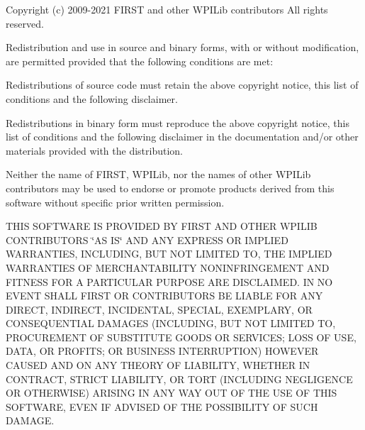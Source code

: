 Copyright (c) 2009-\/2021 FIRST and other WPILib contributors All rights reserved.

Redistribution and use in source and binary forms, with or without modification, are permitted provided that the following conditions are met\+:
\begin{DoxyItemize}
\item Redistributions of source code must retain the above copyright notice, this list of conditions and the following disclaimer.
\item Redistributions in binary form must reproduce the above copyright notice, this list of conditions and the following disclaimer in the documentation and/or other materials provided with the distribution.
\item Neither the name of FIRST, WPILib, nor the names of other WPILib contributors may be used to endorse or promote products derived from this software without specific prior written permission.
\end{DoxyItemize}

THIS SOFTWARE IS PROVIDED BY FIRST AND OTHER WPILIB CONTRIBUTORS \char`\"{}\+AS IS\char`\"{} AND ANY EXPRESS OR IMPLIED WARRANTIES, INCLUDING, BUT NOT LIMITED TO, THE IMPLIED WARRANTIES OF MERCHANTABILITY NONINFRINGEMENT AND FITNESS FOR A PARTICULAR PURPOSE ARE DISCLAIMED. IN NO EVENT SHALL FIRST OR CONTRIBUTORS BE LIABLE FOR ANY DIRECT, INDIRECT, INCIDENTAL, SPECIAL, EXEMPLARY, OR CONSEQUENTIAL DAMAGES (INCLUDING, BUT NOT LIMITED TO, PROCUREMENT OF SUBSTITUTE GOODS OR SERVICES; LOSS OF USE, DATA, OR PROFITS; OR BUSINESS INTERRUPTION) HOWEVER CAUSED AND ON ANY THEORY OF LIABILITY, WHETHER IN CONTRACT, STRICT LIABILITY, OR TORT (INCLUDING NEGLIGENCE OR OTHERWISE) ARISING IN ANY WAY OUT OF THE USE OF THIS SOFTWARE, EVEN IF ADVISED OF THE POSSIBILITY OF SUCH DAMAGE. 